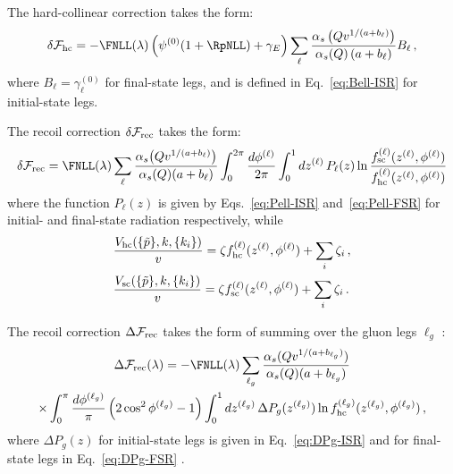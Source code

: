 The hard-collinear correction takes the form:
\begin{equation}
  \label{eq:dFhc-general-add}
   \delta\mathcal{F}_{\rm hc}=-\FNLL(\lambda)\left(\psi^{(0)}(1+\RpNLL)+\gamma_E\right)\sum_\ell \frac{\alpha_s\left(Qv^{1/(a+b_\ell)}\right)}{\alpha_s(Q)\left(a+b_\ell\right)}B_\ell \,,
\end{equation}
where $B_{\ell}=\gamma_{\ell}^{(0)}$ for final-state legs, and is defined in Eq.~\eqref{eq:Bell-ISR} for initial-state legs.

The recoil correction $\delta\mathcal{F}_{\rm rec}$ takes the form:
\begin{equation}
  \label{eq:dFrec-general-add}
  \delta\mathcal{F}_{\rm rec} = \FNLL(\lambda)
  \sum_\ell 
  \frac{\alpha_s\!\left(Qv^{1/(a+b_\ell)}\right)}
       {\alpha_s(Q)(a+b_\ell)}
 \int_0^{2\pi} \frac{d\phi^{(\ell)}}{2\pi}\int_0^1 dz^{(\ell)}\,P_\ell(z)\ln \frac{f_{\rm sc}^{(\ell)}(z^{(\ell)},\phi^{(\ell)})}{f_{\rm hc}^{(\ell)}(z^{(\ell)},\phi^{(\ell)})}
\end{equation}
where the function $P_{\ell}(z)$ is given by Eqs.~\eqref{eq:Pell-ISR} and~\eqref{eq:Pell-FSR}
for initial- and final-state radiation respectively, while
\begin{subequations}
\begin{align}
&\frac{V_{\rm hc}(\{\tilde{p}\},k,\{k_i\})}{v}=\zeta f_{\rm hc}^{(\ell)}(z^{(\ell)},\phi^{(\ell)})+\sum_i\zeta_i\,,\\
&\frac{V_{\rm sc}(\{\tilde{p}\},k,\{k_i\})}{v}=\zeta f_{\rm sc}^{(\ell)}(z^{(\ell)},\phi^{(\ell)})+\sum_i\zeta_i\,.
\end{align}
\end{subequations}

The recoil correction $\Delta\mathcal{F}_{\rm rec}$ takes the form of summing over the gluon legs $\ell_g$ : 
\begin{multline}
 \label{eq:DFrec-general-add}
	\Delta\mathcal{F}_{\rm rec}(\lambda)=-\FNLL(\lambda)\sum_{\ell_g}\frac{\alpha_s(Qv^{1/(a+b_{\ell_g})})}{\alpha_s(Q)(a+b_{\ell_g})}\\\times\int_0^{\pi}\frac{d\phi^{(\ell_g)}}{\pi}\left(2\cos^2\phi^{(\ell_g)}-1\right)\int_0^1dz^{(\ell_g)}\, \Delta P_g(z^{(\ell_g)})\ln f_{\rm hc}^{(\ell_g)}(z^{(\ell_g)},\phi^{(\ell_g)})\,,
\end{multline}
where $\Delta P_g(z)$ for initial-state legs is given in Eq.~\eqref{eq:DPg-ISR} 
and for final-state legs in Eq.~\eqref{eq:DPg-FSR} .


